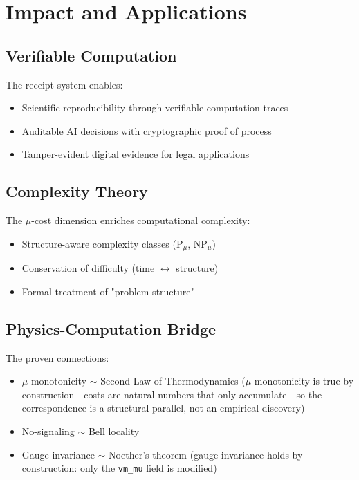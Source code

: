 \section{Impact and Applications}

\subsection{Verifiable Computation}

The receipt system enables:
\begin{itemize}
    \item Scientific reproducibility through verifiable computation traces
    \item Auditable AI decisions with cryptographic proof of process
    \item Tamper-evident digital evidence for legal applications
\end{itemize}

\subsection{Complexity Theory}

The $\mu$-cost dimension enriches computational complexity:
\begin{itemize}
    \item Structure-aware complexity classes ($\text{P}_\mu$, $\text{NP}_\mu$)
    \item Conservation of difficulty (time $\leftrightarrow$ structure)
    \item Formal treatment of "problem structure"
\end{itemize}

\subsection{Physics-Computation Bridge}

The proven connections:
\begin{itemize}
    \item $\mu$-monotonicity $\sim$ Second Law of Thermodynamics ($\mu$-monotonicity is true by construction---costs are natural numbers that only accumulate---so the correspondence is a structural parallel, not an empirical discovery)
    \item No-signaling $\sim$ Bell locality
    \item Gauge invariance $\sim$ Noether's theorem (gauge invariance holds by construction: only the \texttt{vm\_mu} field is modified)
\end{itemize}


